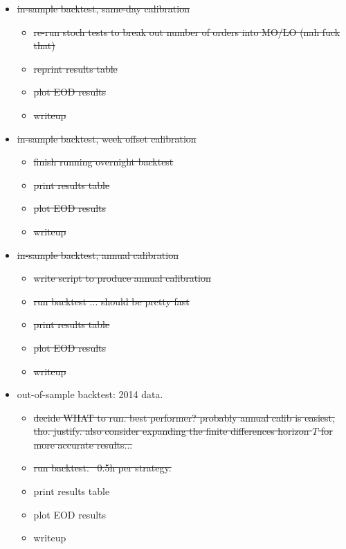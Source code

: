 \documentclass[12pt]{article}
\begin{document}
\begin{itemize}[topsep=0pt,itemsep=0ex,partopsep=0ex,parsep=0ex]
\item \st{in-sample backtest, same-day calibration}
\begin{itemize}[topsep=0pt,itemsep=0ex,partopsep=0ex,parsep=0ex]
\item \st{re-run stoch tests to break out number of orders into MO/LO (nah fuck that)}
\item \st{reprint results table}
\item \st{plot EOD results}
\item \st{writeup}
\end{itemize}

\item \st{in-sample backtest, week offset calibration}
\begin{itemize}[topsep=0pt,itemsep=0ex,partopsep=0ex,parsep=0ex]
\item \st{finish running overnight backtest}
\item \st{print results table}
\item \st{plot EOD results}
\item \st{writeup}
\end{itemize}

\item \st{in-sample backtest, annual calibration}
\begin{itemize}[topsep=0pt,itemsep=0ex,partopsep=0ex,parsep=0ex]
\item \st{write script to produce annual calibration}
\item \st{run backtest ... should be pretty fast}
\item \st{print results table}
\item \st{plot EOD results}
\item \st{writeup}
\end{itemize}

\item out-of-sample backtest: 2014 data.
\begin{itemize}[topsep=0pt,itemsep=0ex,partopsep=0ex,parsep=0ex]
\item \st{decide WHAT to run. best performer? probably annual calib is easiest, tho. justify. also consider expanding the finite differences horizon $T$ for more accurate results...}
\item \st{run backtest. ~0.5h per strategy.}
\item print results table
\item plot EOD results
\item writeup
\end{itemize}


\end{itemize}
\end{document}
